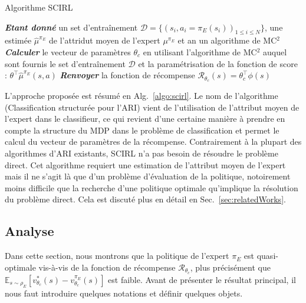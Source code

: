 \documentclass[english,utf8]{./hermes-journal}
\newcommand{\R}{\mathcal{R}}
\newcommand{\D}{\mathcal{D}}
\newcommand{\E}{\mathbb{E}}
\begin{document}
\begin{algorithm2e}%
  \SetAlgoVlined
  \caption{Algorithme SCIRL}
  \label{algo:scirl}
  \BlankLine
  \emph{\textbf{Etant donné}} un set d'entraînement $\D = \{(s_i,a_i=\pi_E(s_i))_{1\leq i\leq N}\}$,
  une estimée $\hat{\mu}^{\pi_E}$ de l'attridut moyen de l'expert $\mu^{\pi_E}$ et an un algorithme de MC$^2$\;
  \BlankLine
  \emph{\textbf{Calculer}} le vecteur de paramètres $\theta_c$ en utilisant l'algorithme de MC$^2$ auquel sont fournis le set d'entraînement $\D$ et la paramétrisation de la fonction de score : $\theta^\top\hat{\mu}^{\pi_E}(s,a)$\;
  \BlankLine
  \emph{\textbf{Renvoyer}} la fonction de récompense $\R_{\theta_c}(s) = \theta_c^\top\phi(s)$ \;
\end{algorithm2e}

L'approche proposée est résumé en Alg.~\ref{algo:scirl}. Le nom de l'algorithme (Classification structurée pour l'ARI) vient de l'utilisation de l'attribut moyen de l'expert dans le classifieur, ce qui revient d'une certaine manière à prendre en compte la structure du MDP dans le problème de classification et permet le calcul du vecteur de paramètres de la récompense. Contrairement à la plupart des algorithmes d'ARI existants, SCIRL n'a pas besoin de résoudre le problème direct. Cet algorithme requiert une estimation de l'attribut moyen de l'expert mais il ne s'agit là que d'un problème d'évaluation de la politique, notoirement moins difficile que la recherche d'une politique optimale qu'implique la résolution du problème direct. Cela est discuté plus en détail en Sec.~\ref{sec:relatedWorks}.
%


\subsection{Analyse}
\label{subsec:scirl:analysis}

Dans cette section, nous montrons que la politique de l'expert $\pi_E$ est quasi-optimale vis-à-vis de la fonction de récompense $\R_{\theta_c}$, plus précisément que 
$\E_{s\sim\rho_E}[v^*_{\theta_c}(s)-v^{\pi_E}_{\theta_c}(s)]$ est faible.
Avant de présenter le résultat principal, il nous faut introduire quelques notations et définir quelques objets.
\end{document}
